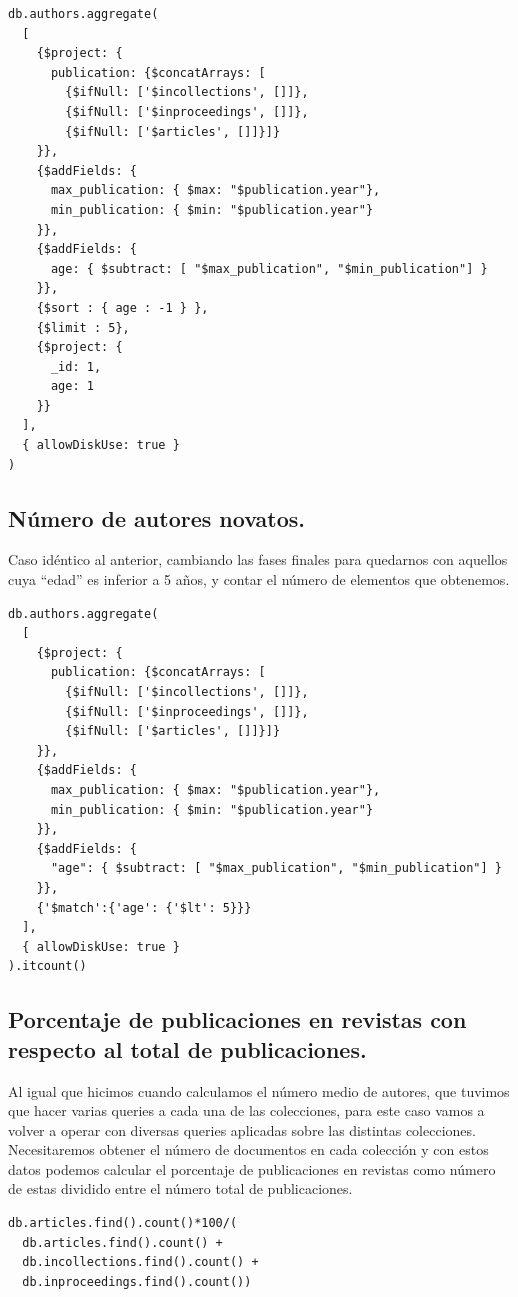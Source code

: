 \begin{verbatim}
db.authors.aggregate(
  [
    {$project: {
      publication: {$concatArrays: [
        {$ifNull: ['$incollections', []]},
        {$ifNull: ['$inproceedings', []]},
        {$ifNull: ['$articles', []]}]}
    }},
    {$addFields: {
      max_publication: { $max: "$publication.year"},
      min_publication: { $min: "$publication.year"}
    }},
    {$addFields: {
      age: { $subtract: [ "$max_publication", "$min_publication"] }
    }},
    {$sort : { age : -1 } },
    {$limit : 5},
    {$project: {
      _id: 1,
      age: 1
    }}
  ],
  { allowDiskUse: true }
)
\end{verbatim}

\subsection{Número de autores novatos.}

Caso idéntico al anterior, cambiando las fases finales para quedarnos con aquellos cuya ``edad'' es inferior a 5 años, y contar el número de elementos que obtenemos.

\begin{verbatim}
db.authors.aggregate(
  [
    {$project: {
      publication: {$concatArrays: [
        {$ifNull: ['$incollections', []]},
        {$ifNull: ['$inproceedings', []]},
        {$ifNull: ['$articles', []]}]}
    }},
    {$addFields: {
      max_publication: { $max: "$publication.year"},
      min_publication: { $min: "$publication.year"}
    }},
    {$addFields: {
      "age": { $subtract: [ "$max_publication", "$min_publication"] }
    }},
    {'$match':{'age': {'$lt': 5}}}
  ],
  { allowDiskUse: true }
).itcount()

\end{verbatim}

\subsection{Porcentaje de publicaciones en revistas con respecto al total de publicaciones.}

Al igual que hicimos cuando calculamos el número medio de autores, que tuvimos que hacer varias queries a cada una de las colecciones, para este caso vamos a volver a operar con diversas queries aplicadas sobre las distintas colecciones. Necesitaremos obtener el número de documentos en cada colección y con estos datos podemos calcular el porcentaje de publicaciones en revistas como número de estas dividido entre el número total de publicaciones.

\begin{verbatim}
db.articles.find().count()*100/(
  db.articles.find().count() + 
  db.incollections.find().count() + 
  db.inproceedings.find().count())
\end{verbatim}
